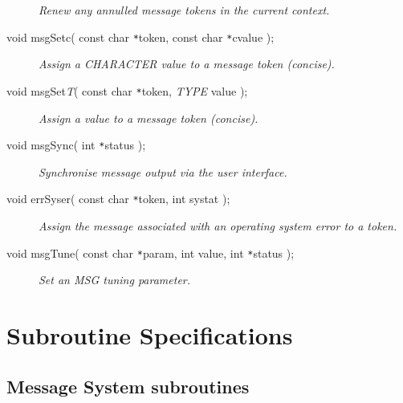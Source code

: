 \documentclass[twoside,11pt]{article}
\newcommand{\xlabel}[1]{}
\renewcommand{\_}{\texttt{\symbol{95}}}
\newcommand{\listline}{\hspace{1pt}\\}
\renewcommand{\listline}{}
\begin{document}
\begin{description}
\textit{Renew any annulled message tokens in the current context.}
\item[void msgSetc( const char \texttt{*}token, 
const char \texttt{*}cvalue );] \listline
\textit{Assign a CHARACTER value to a message token (concise).}
\item[void msgSet\textit{T}( const char \texttt{*}token, 
\textit{TYPE} value );] \listline
\textit{Assign a value to a message token (concise).}
\item[void msgSync( int \texttt{*}status );] \listline
\textit{Synchronise message output via the user interface.}
\item[void errSyser( const char \texttt{*}token, int systat );] \listline
\textit{Assign the message associated with an operating system error to a
token.}
\item[void msgTune( const char \texttt{*}param, int value, 
int \texttt{*}status );] \listline
\textit{Set an MSG tuning parameter.}
\end{description}

\newpage
\section{\xlabel{subroutine_specifications}Subroutine Specifications \label{specs_sect}}
\subsection{\xlabel{message_system_subroutines}Message System subroutines}
\end{document}

